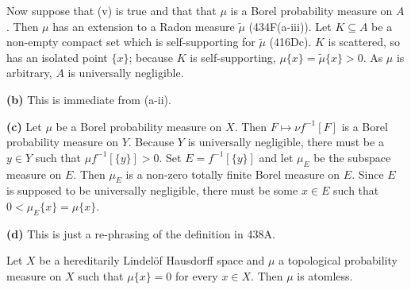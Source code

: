 {\medskip

 Now suppose that (v) is true and that
that $\mu$ is a Borel probability measure on $A$.   Then $\mu$ has an
extension to a Radon measure $\tilde\mu$ (434F(a-iii)).   Let
$K\subseteq A$ be a non-empty compact set which is self-supporting for
$\tilde\mu$ (416Dc).   $K$ is scattered, so has an isolated point
$\{x\}$;  because $K$ is self-supporting, $\mu\{x\}=\tilde\mu\{x\}>0$.
As $\mu$ is arbitrary, $A$ is universally negligible.

\medskip

{\bf (b)} This is immediate from (a-ii).

\medskip

{\bf (c)} Let $\mu$ be a Borel probability measure on $X$.   Then
$F\mapsto\nu f^{-1}[F]$ is a Borel probability measure on $Y$.   Because
$Y$ is universally negligible, there must be a $y\in Y$ such that
$\mu f^{-1}[\{y\}]>0$.   Set $E=f^{-1}[\{y\}]$ and let $\mu_E$ be the
subspace measure on $E$.   Then $\mu_E$ is a non-zero totally finite
Borel measure on $E$.   Since $E$ is supposed to be universally
negligible, there must be some $x\in E$ such that
$0<\mu_E\{x\}=\mu\{x\}$.

\medskip

{\bf (d)} This is just a re-phrasing of the definition in 438A.
}%


   Let $X$ be a hereditarily
Lindel\"of Hausdorff space and $\mu$ a topological probability measure
on $X$ such that $\mu\{x\}=0$ for every $x\in X$.   Then $\mu$ is
atomless.


